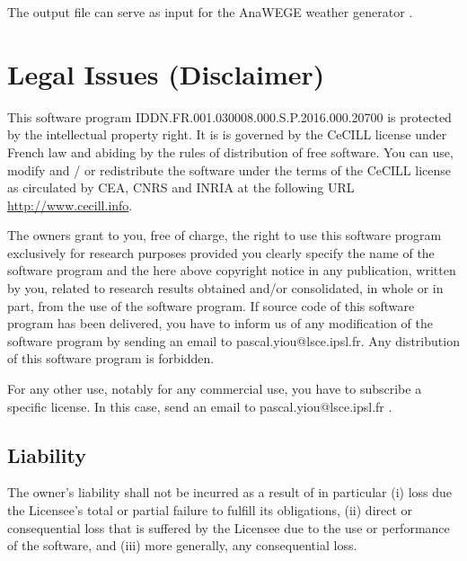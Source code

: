 \documentclass[11p,a4paper]{article}
\begin{document}
The output file can serve as input for the AnaWEGE weather generator \citep{yiou14a}.

\section{Legal Issues (Disclaimer)}
This software program IDDN.FR.001.030008.000.S.P.2016.000.20700 is protected by the intellectual property right. 
It is is governed by the CeCILL license under French law and abiding by the rules of distribution 
of free software. You can use, modify and / or redistribute the software under the terms of the 
 CeCILL license as circulated by CEA, CNRS and INRIA at the following URL \href{http://www.cecill.info}{http://www.cecill.info}.
 
The owners grant to you, free of charge, the right to use this software program exclusively for research purposes provided you clearly specify the name of the software program and the here above copyright notice in any publication, written by you, related to research results obtained and/or consolidated, in whole or in part, from the use of the software program. 
If source code of this software program has been delivered, you have to inform us of any modification of the software program by sending an email to pascal.yiou@lsce.ipsl.fr.
Any distribution of this software program is forbidden. 

For any other use, notably for any commercial use, you have to subscribe a specific license. In this case, send an email to pascal.yiou@lsce.ipsl.fr .

\subsection{Liability}
The owner’s liability shall not be incurred as a result of in particular (i) loss due the Licensee's total or partial failure to fulfill its obligations, (ii) direct or consequential loss that is suffered by the Licensee due to the use or performance of the software, and (iii) more generally, any consequential loss. 
\end{document}
